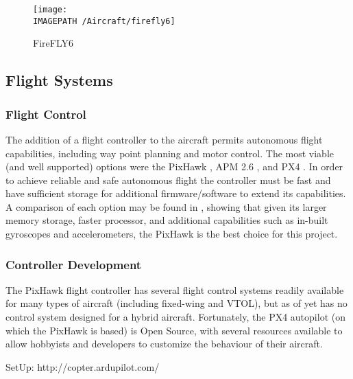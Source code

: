 \begin{figure}[!h]
	\centering
	\texttt{[image: \\IMAGEPATH /Aircraft/firefly6]}
	\caption{FireFLY6}
	\label{fig:firefly6}
\end{figure}

\subsection{Flight Systems}
\subsubsection*{Flight Control}
The addition of a flight controller to the aircraft permits autonomous flight capabilities, including way point planning and motor control. The most viable (and well supported) options were the PixHawk \cite{ref:pixhawk}, APM 2.6 \cite{ref:ardupilot}, and PX4 \cite{ref:px4}. In order to achieve reliable and safe autonomous flight the controller must be fast and have sufficient storage for additional firmware/software to extend its capabilities. A comparison of each option may be found in \cite{ref:controller_comparison}, showing that given its larger memory storage, faster processor, and additional capabilities such as in-built gyroscopes and accelerometers, the PixHawk is the best choice for this project.

\subsubsection*{Controller Development}
The PixHawk flight controller has several flight control systems readily available for many types of aircraft (including fixed-wing and VTOL), but as of yet has no control system designed for a hybrid aircraft. Fortunately, the PX4 autopilot (on which the PixHawk is based) is Open Source\cite{ref:ardupilotgit}, with several resources available \cite{ref:firmware1,ref:firmware2} to allow hobbyists and developers to customize the behaviour of their aircraft.

\color{red}
SetUp:
http://copter.ardupilot.com/
\color{black}